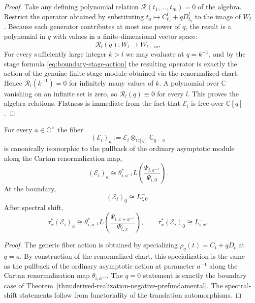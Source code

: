 \begin{proof}
Take any defining polynomial relation
$\mathscr R(t_1,\dots,t_m)=0$ of the algebra.  Restrict the operator
obtained by substituting $t_a\mapsto C_{t_a}^l+qD_{t_a}^l$ to the image of
$W_l$.  Because each generator contributes at most one power of $q$, the
result is a polynomial in $q$ with values in a finite-dimensional vector
space:
\begin{equation}
\mathscr R_l(q):W_l\longrightarrow W_{l+m}.
\end{equation}
For every sufficiently large integer $k>l$ we may evaluate at $q=k^{-1}$,
and by the stage formula \eqref{eq:boundary-stage-action} the resulting
operator is exactly the action of the genuine finite-stage module obtained
via the renormalized chart.  Hence $\mathscr R_l(k^{-1})=0$ for infinitely
many values of $k$.  A polynomial over $\mathbb C$ vanishing on an
infinite set is zero, so $\mathscr R_l(q)\equiv 0$ for every $l$.  This
proves the algebra relations.  Flatness is immediate from the fact that
$\mathcal E_i$ is free over $\mathbb C[q]$.
\end{proof}

\begin{theorem}
\ClaimStatusProvedHere
\label{thm:generic-and-boundary-fibers}
For every $a\in \mathbb C^\times$ the fiber
\begin{equation}
(\mathcal E_i)_a:=\mathcal E_i\otimes_{\mathbb C[q]}\mathbb C_{q=a}
\end{equation}
is canonically isomorphic to the pullback of the ordinary asymptotic
module along the Cartan renormalization map,
\begin{equation}
(\mathcal E_i)_a
\cong
\theta_{i,a^{-1}}^*L\!\left(\frac{\Psi_{i,a^{-1}}}{\Psi_{i,0}}\right).
\end{equation}
At the boundary,
\begin{equation}
(\mathcal E_i)_0\cong L^-_{i,0}.
\end{equation}
After spectral shift,
\begin{equation}
\tau_x^*(\mathcal E_i)_a
\cong
\theta_{i,a^{-1}}^*L\!\left(\frac{\Psi_{i,x+a^{-1}}}{\Psi_{i,x}}\right),
\qquad
\tau_x^*(\mathcal E_i)_0\cong L^-_{i,x}.
\end{equation}
\end{theorem}

\begin{proof}
The generic fiber action is obtained by specializing
$\rho_q(t)=C_t+qD_t$ at $q=a$.  By construction of the renormalized chart,
this specialization is the same as the pullback of the ordinary
asymptotic action at parameter $a^{-1}$ along the Cartan renormalization
map $\theta_{i,a^{-1}}$.  The $q=0$ statement is exactly the boundary case
of Theorem~\ref{thm:derived-realization-negative-prefundamental}.  The
spectral-shift statements follow from functoriality of the translation
automorphisms.
\end{proof}

